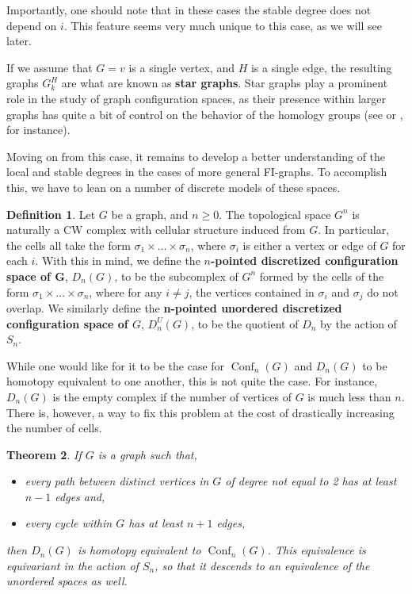 \documentclass[12pt]{amsart}
\newtheorem{thm}{Theorem}[section]
\theoremstyle{definition}
\newtheorem{defn}[thm]{Definition}
\newcommand{\conf}{\operatorname{Conf}}
\begin{document}
Importantly, one should note that in these cases the stable degree does not depend on $i$. This feature seems very much unique to this case, as we will see later.

If we assume that $G = v$ is a single vertex, and $H$ is a single edge, the resulting graphs $G^H_k$ are what are known as \textbf{star graphs}. Star graphs play a prominent role in the study of graph configuration spaces, as their presence within larger graphs has quite a bit of control on the behavior of the homology groups (see \cite{ADCK} or \cite{CL}, for instance).

Moving on from this case, it remains to develop a better understanding of the local and stable degrees in the cases of more general FI-graphs. To accomplish this, we have to lean on a number of discrete models of these spaces.

\begin{defn}
    Let $G$ be a graph, and $n \geq 0$. The topological space $G^n$ is naturally a CW complex with cellular structure induced from $G$. In particular, the cells all take the form $\sigma_1 \times \ldots \times \sigma_n$, where $\sigma_i$ is either a vertex or edge of $G$ for each $i$. With this in mind, we define the \textbf{$n$-pointed discretized configuration space of G}, $D_n(G)$, to be the subcomplex of $G^n$ formed by the cells of the form $\sigma_1 \times \ldots \times \sigma_n$, where for any $i \neq j$, the vertices contained in $\sigma_i$ and $\sigma_j$ do not overlap. We similarly define the \textbf{n-pointed unordered discretized configuration space of $G$}, $D^U_n(G)$, to be the quotient of $D_n$ by the action of $S_n$.
\end{defn}

While one would like for it to be the case for $\conf_n(G)$ and $D_n(G)$ to be homotopy equivalent to one another, this is not quite the case. For instance, $D_n(G)$ is the empty complex if the number of vertices of $G$ is much less than $n$. There is, however, a way to fix this problem at the cost of drastically increasing the number of cells.

\begin{thm}\cite{Abr}\label{AbramsModel}
    If $G$ is a graph such that,
    \begin{itemize}
        \item every path between distinct vertices in $G$ of degree not equal to 2 has at least $n-1$ edges and,
        \item every cycle within $G$ has at least $n+1$ edges,
    \end{itemize}
    then $D_n(G)$ is homotopy equivalent to $\conf_n(G)$. This equivalence is equivariant in the action of $S_n$, so that it descends to an equivalence of the unordered spaces as well.
\end{thm}
\end{document}

